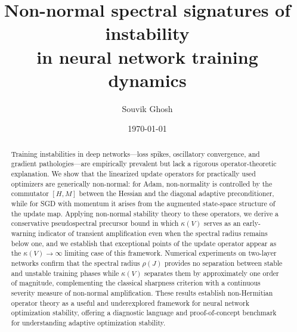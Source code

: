 \documentclass[aps,prresearch,twocolumn,superscriptaddress,longbibliography]{revtex4-2}
\begin{document}
\title{Non-normal spectral signatures of instability\\
in neural network training dynamics}

\author{Souvik Ghosh}


\date{\today}

\begin{abstract}
Training instabilities in deep networks---loss spikes, oscillatory
convergence, and gradient pathologies---are empirically prevalent but
lack a rigorous operator-theoretic explanation.
We show that the linearized update operators for practically used
optimizers are generically non-normal: for Adam, non-normality is
controlled by the commutator $[H,M]$ between the Hessian and the
diagonal adaptive preconditioner, while for SGD with momentum it arises
from the augmented state-space structure of the update map.
Applying non-normal stability theory to these operators, we derive a
conservative pseudospectral precursor bound in which $\kappa(V)$ serves
as an early-warning indicator of transient amplification even when the
spectral radius remains below one, and we establish that exceptional
points of the update operator appear as the $\kappa(V)\to\infty$
limiting case of this framework.
Numerical experiments on two-layer networks confirm that the spectral
radius $\rho(J)$ provides no separation between stable and unstable
training phases while $\kappa(V)$ separates them by approximately one
order of magnitude, complementing the classical sharpness criterion with
a continuous severity measure of non-normal amplification.
These results establish non-Hermitian operator theory as a useful and
underexplored framework for neural network optimization stability,
offering a diagnostic language and proof-of-concept benchmark for
understanding adaptive optimization stability.
\end{abstract}

\maketitle

\end{document}
